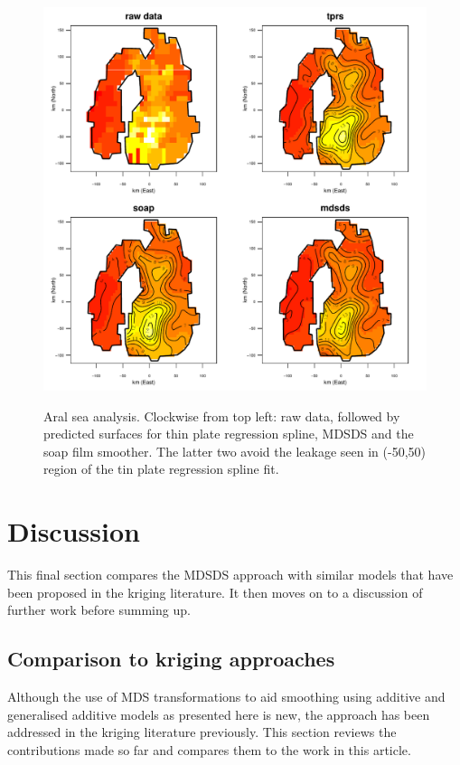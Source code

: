 \documentclass[useAMS, referee]{biom}
\begin{document}
\begin{figure}
\centering
\includegraphics[width=\textwidth]{examples/aral/aral-plot.pdf} \\
\caption{Aral sea analysis. Clockwise from top left: raw data, followed by predicted surfaces for thin plate regression spline, MDSDS and the soap film smoother. The latter two avoid the leakage seen in (-50,50) region of the tin plate regression spline fit.}
\label{aral-plot}
\end{figure}




\section{Discussion}
\label{conclusion}

This final section compares the MDSDS approach with similar models that have been proposed in the kriging literature. It then moves on to a discussion of further work before summing up.

\subsection{Comparison to kriging approaches}

Although the use of MDS transformations to aid smoothing using additive and generalised additive models as presented here is new, the approach has been addressed in the kriging literature previously. This section reviews the contributions made so far and compares them to the work in this article.
\end{document}
